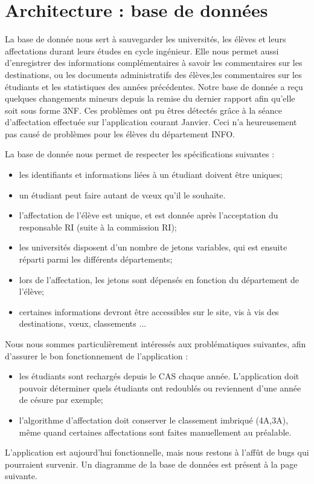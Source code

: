 \chapter{Architecture : base de données}

La base de donnée nous sert à sauvegarder les universités, les élèves et leurs affectations durant leurs études en cycle ingénieur. Elle nous permet aussi d'enregistrer des informations complémentaires à savoir les commentaires sur les destinations, ou les documents administratifs des élèves,les commentaires sur les étudiants et les statistiques des années précédentes.
\bigbreak
Notre base de donnée a reçu quelques changements mineurs depuis la remise du dernier rapport afin qu'elle soit sous forme 3NF. Ces problèmes ont pu êtres détectés grâce à la séance d'affectation effectuée sur l'application courant Janvier. Ceci n'a heureusement pas causé de problèmes pour les élèves du département INFO.

La base de donnée nous permet de respecter les spécifications suivantes :
\bigbreak
\begin{itemize}
	\item les identifiants et informations liées à un étudiant doivent être uniques;
	\item un étudiant peut faire autant de vœux qu'il le souhaite.
	\item l'affectation de l'élève est unique, et est donnée après l'acceptation du responsable RI (suite à la commission RI);
	\item les universités disposent d'un nombre de jetons variables, qui est ensuite réparti parmi les différents départements;
	\item lors de l'affectation, les jetons sont dépensés en fonction du département de l'élève;
	\item certaines informations devront être accessibles sur le site, vis à vis des destinations, vœux, classements ...
\end{itemize}
\bigbreak
Nous nous sommes particulièrement intéressés aux problématiques suivantes, afin d'assurer le bon fonctionnement de l'application :
\bigbreak
\begin{itemize}
	\item les étudiants sont rechargés depuis le CAS chaque année. L'application doit pouvoir déterminer quels étudiants ont redoublés ou reviennent d'une année de césure par exemple;
	\item l'algorithme d'affectation doit conserver le classement imbriqué (4A,3A), même quand certaines affectations sont faites manuellement au préalable.
\end{itemize}
\bigbreak
L'application est aujourd'hui fonctionnelle, mais nous restons à l'affût de bugs qui pourraient survenir. Un diagramme de la base de données est présent à la page suivante.

